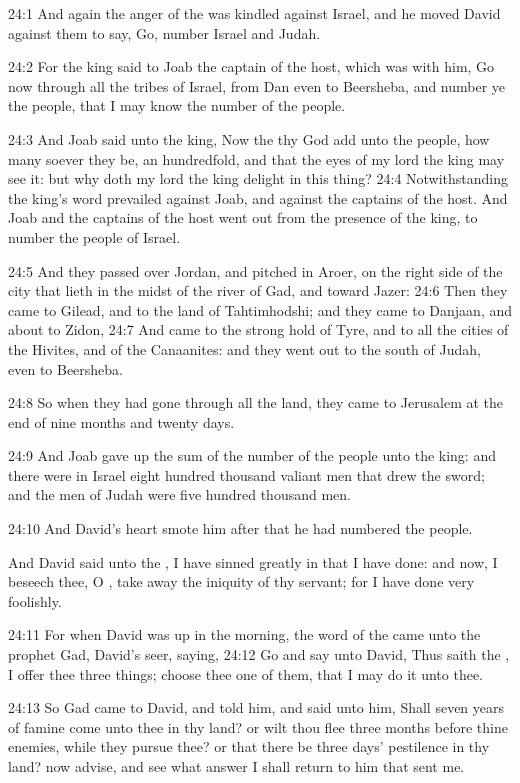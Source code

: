 24:1 And again the anger of the \LORD was kindled against Israel, and he moved David against them to say, Go, number Israel and Judah.

24:2 For the king said to Joab the captain of the host, which was with him, Go now through all the tribes of Israel, from Dan even to Beersheba, and number ye the people, that I may know the number of the people.

24:3 And Joab said unto the king, Now the \LORD thy God add unto the people, how many soever they be, an hundredfold, and that the eyes of my lord the king may see it: but why doth my lord the king delight in this thing?  24:4 Notwithstanding the king's word prevailed against Joab, and against the captains of the host. And Joab and the captains of the host went out from the presence of the king, to number the people of Israel.

24:5 And they passed over Jordan, and pitched in Aroer, on the right side of the city that lieth in the midst of the river of Gad, and toward Jazer: 24:6 Then they came to Gilead, and to the land of Tahtimhodshi; and they came to Danjaan, and about to Zidon, 24:7 And came to the strong hold of Tyre, and to all the cities of the Hivites, and of the Canaanites: and they went out to the south of Judah, even to Beersheba.

24:8 So when they had gone through all the land, they came to Jerusalem at the end of nine months and twenty days.

24:9 And Joab gave up the sum of the number of the people unto the king: and there were in Israel eight hundred thousand valiant men that drew the sword; and the men of Judah were five hundred thousand men.

24:10 And David's heart smote him after that he had numbered the people.

And David said unto the \LORD, I have sinned greatly in that I have done: and now, I beseech thee, O \LORD, take away the iniquity of thy servant; for I have done very foolishly.

24:11 For when David was up in the morning, the word of the \LORD came unto the prophet Gad, David's seer, saying, 24:12 Go and say unto David, Thus saith the \LORD, I offer thee three things; choose thee one of them, that I may do it unto thee.

24:13 So Gad came to David, and told him, and said unto him, Shall seven years of famine come unto thee in thy land? or wilt thou flee three months before thine enemies, while they pursue thee? or that there be three days' pestilence in thy land? now advise, and see what answer I shall return to him that sent me.

